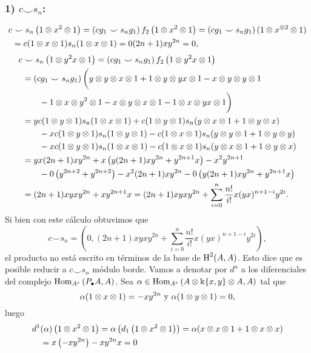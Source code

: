 \documentclass[fleqn,../tesis.tex]{subfiles}
\begin{document}
\subsubsection{1) $c \smile s_n$:}
\begin{align*}
	c &\smile s_n\left(1\otimes x^{2} \otimes 1\right) = \left(c g_1 \smile s_n g_1\right)f_2\left(1\otimes x^2 \otimes 1\right)
		= \left(c g_1 \smile s_n g_1\right)(1 \otimes x^{\otimes 2}\otimes 1)\\
	&= c(1\otimes x \otimes 1)s_n(1 \otimes x \otimes 1) = 0 (2n + 1)xy^{2n} = 0,
\end{align*}
\begin{align*}
	c &\smile s_n\left(1\otimes y^2x \otimes 1\right) = \left(c g_1 \smile s_n g_1\right)f_2\left(1\otimes y^2x \otimes 1\right)\\
	&= \left(c g_1 \smile s_n g_1\right)\bigg(y \otimes y \otimes x \otimes 1 + 1 \otimes y \otimes yx \otimes 1 
		- x \otimes y \otimes y \otimes 1\\ &\qquad - 1\otimes x \otimes y^2 \otimes 1 - x \otimes y \otimes x \otimes 1 
		- 1\otimes x \otimes yx \otimes 1\bigg) \\
	&= y c(1 \otimes y \otimes 1)s_n(1 \otimes x \otimes 1) + c(1\otimes y \otimes 1)s_n(y \otimes x \otimes 1 + 1 \otimes y \otimes x)\\
	&\qquad -xc(1\otimes y \otimes 1)s_n(1 \otimes y \otimes 1) -c(1\otimes x \otimes 1)s_n(y \otimes y \otimes 1 + 1\otimes y \otimes y)\\
	&\qquad -xc(1\otimes y \otimes 1)s_n(1 \otimes x \otimes 1) -c(1\otimes x \otimes 1)s_n(y \otimes x \otimes 1 + 1\otimes y \otimes x)\\
	&= yx(2n + 1)xy^{2n} + x\left(y(2n + 1)xy^{2n} + y^{2n + 1}x\right) - x^2y^{2n + 1} \\
	&\qquad - 0\left(y^{2n + 2} + y^{2n + 2}\right) - x^2(2n + 1)xy^{2n}
		- 0\left(y(2n + 1)xy^{2n} + y^{2n + 1} x\right)\\
	&= (2n + 1)xyxy^{2n} + xy^{2n + 1}x = (2n + 1)xyxy^{2n} + \sum_{i = 0}^{n}\frac{n!}{i!}x(yx)^{n  + 1 -i}y^{2i}.
\end{align*}
Si bien con este cálculo obtuvimos que
\[
	c \smile s_n = \left(0, (2n + 1)xyxy^{2n} + \sum_{i = 0}^{n}\frac{n!}{i!}x(yx)^{n  + 1 -i}y^{2i}\right),
\]
el producto no está escrito en términos de la base de $\operatorname{H}^{2}(A, A)$. Esto dice que es posible reducir
a $c \smile s_n$ módulo borde. Vamos a denotar por $d^{n}$ a los diferenciales del complejo
$\operatorname{Hom}_{A^e}\left(P_{\bullet}A, A\right)$. Sea $\alpha \in \operatorname{Hom}_{A^e}\left(A\otimes \Bbbk\{x, y\}\otimes A, A\right)$
tal que \[\alpha(1\otimes x \otimes 1) = -xy^{2n} \text{ y } \alpha(1\otimes y \otimes 1) = 0,\]
luego
\begin{align*}
	d^{1}&(\alpha)\left(1 \otimes x^{2} \otimes 1\right) = \alpha \left(d_1\left(1\otimes x^{2} \otimes 1\right)\right)
		= \alpha(x \otimes  x \otimes 1 + 1 \otimes x \otimes x) \\
	&= x \left(-xy^{2n}\right) - xy^{2n}x = 0
\end{align*}
\end{document}
